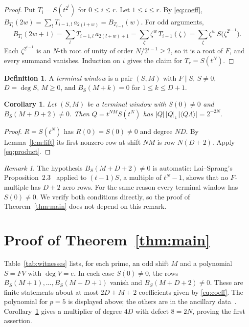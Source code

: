 \documentclass[11pt]{amsart}
\newtheorem{corollary}[theorem]{Corollary}
\theoremstyle{definition}
\newtheorem{definition}[theorem]{Definition}
\theoremstyle{remark}
\newtheorem{remark}[theorem]{Remark}
\newcommand{\abs}[1]{\left|#1\right|}
\newcommand{\frp}[1]{\langle #1\rangle}
\begin{document}
\begin{proof}
Put $T_i=S(t^{2^i})$ for $0\le i\le r$. Let $1\le i\le r$. By \eqref{eq:coeff},
$B_{T_i}(2w)=\sum_lT_{i-1,l}\,a_{2(l+w)}=B_{T_{i-1}}(w)$. For odd arguments,
\[
B_{T_i}(2w+1)=\sum_lT_{i-1,l}\,a_{2(l+w)+1}
=\sum_\zeta\zeta^w\,T_{i-1}(\zeta)=\sum_\zeta\zeta^w\,S\bigl(\zeta^{2^{i-1}}\bigr).
\]
Each $\zeta^{2^{i-1}}$ is an $N$-th root of unity of order $N/2^{i-1}\ge2$, so
it is a root of $F$, and every summand vanishes. Induction on $i$ gives the
claim for $T_r=S(t^N)$.
\end{proof}

\begin{definition}
A \emph{terminal window} is a pair $(S,M)$ with $F\mid S$, $S\neq0$,
$D=\deg S$, $M\ge0$, and $B_S(M+k)=0$ for $1\le k\le D+1$.
\end{definition}

\begin{corollary}\label{cor:lift}
Let $(S,M)$ be a terminal window with $S(0)\neq0$ and $B_S(M+D+2)\neq0$. Then
$Q=t^{NM}S(t^N)$ has $\abs{Q}\,\abs{Q}_t\,\abs{\frp{Q\Lambda}}=2^{-2N}$.
\end{corollary}

\begin{proof}
$R=S(t^N)$ has $R(0)=S(0)\neq0$ and degree $ND$. By Lemma~\ref{lem:lift} its
first nonzero row at shift $NM$ is row $N(D+2)$. Apply \eqref{eq:product}.
\end{proof}

\begin{remark}\label{rem:cap}
The hypothesis $B_S(M+D+2)\neq0$ is automatic: Lai--Sprang's
Proposition~2.3~\cite{LS} applied to $(t-1)S$, a multiple of $t^N-1$, shows
that no $F$-multiple has $D+2$ zero rows. For the same reason every terminal
window has $S(0)\neq0$. We verify both
conditions directly, so the proof of Theorem~\ref{thm:main} does not depend on
this remark.
\end{remark}

\section{Proof of Theorem~\ref{thm:main}}\label{sec:proof}

Table~\ref{tab:witnesses} lists, for each prime, an odd shift $M$ and a
polynomial $S=FV$ with $\deg V=e$. In each case $S(0)\neq0$, the rows
$B_S(M+1),\dots,B_S(M+D+1)$ vanish and $B_S(M+D+2)\neq0$. These are finite
statements about at most $2D+M+2$ coefficients given by \eqref{eq:coeff}.
The polynomial for $p=5$ is displayed above; the others are in the ancillary
data~\cite{repo}. Corollary~\ref{cor:lift} gives a multiplier of degree $4D$
with defect $8=2N$, proving the first assertion.
\end{document}
